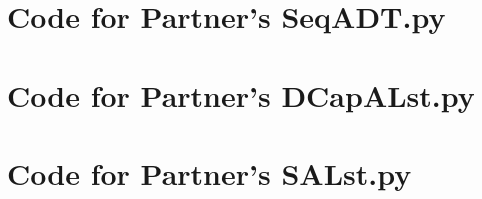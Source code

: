 \documentclass[12pt]{article}
\begin{document}
\newpage

\section{Code for Partner's SeqADT.py}

\noindent 

\newpage

\section{Code for Partner's DCapALst.py}

\noindent 

\newpage

\section{Code for Partner's SALst.py}

\noindent 
\end{document}
